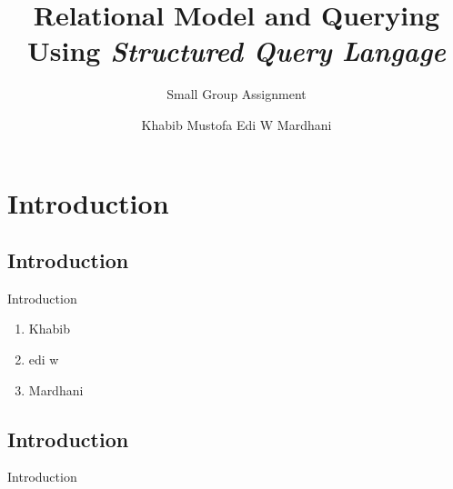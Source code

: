 \documentclass[xcolor=table,t, aspectratio=169]{beamer}
\title[Relational Model and Queries]{Relational Model and Querying \newline Using \textit{Structured Query Langage}}
\subtitle{Small Group Assignment}
\date{}
\author{Khabib Mustofa \newline Edi W \newline Mardhani}
\institute[UGM, Yogyakarta, Indonesia]{Dept of  Computer Science and Electronics, Universitas Gadjah Mada}
\begin{document}
\frontframe
\section{Introduction}
\subsection{Introduction}
\begin{frame}{Introduction}
\footnotesize
    \begin{enumerate}
        \item Khabib
        \item edi w
        \item Mardhani
    \end{enumerate}
\end{frame}
\subsection{Introduction}
\begin{frame}{Introduction}  
\end{frame}

\end{document}

